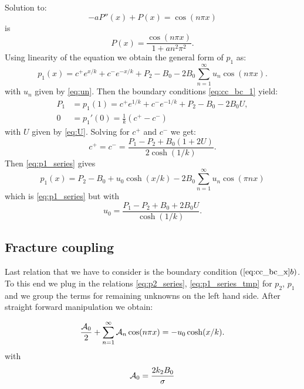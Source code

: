 \documentclass[a4paper,10pt]{article}
\begin{document}
Solution to:
\[
    - a P''(x) + P(x) = \cos(n \pi x) 
\]    
is 
\[
    P(x) = \frac{\cos(n \pi x)}{1+an^2\pi^2}.
\]
Using linearity of the equation we obtain the general form of $p_1$ as:
\begin {equation}
    \label{eq:p1_series}        
    p_1(x) = c^+ e^{x/k} + c^- e^{-x/k} + P_2 - B_0 
    - 2 B_0 \sum^{\infty}_{n=1} u_n \cos (n\pi x).
\end {equation}
with $u_n$ given by \eqref{eq:un}. Then the boundary conditions \eqref{eq:cc_bc_1} yield:
\begin{align*}
P_1 &= p_1(1) = c^+e^{1/k} + c^- e^{-1/k} + P_2 - B_0 - 2 B_0 U, \\
0 &= p_1'(0) = \frac{1}{k}(c^+ - c^-) 
\end{align*}
with $U$ given by \eqref{eq:U}. Solving for $c^+$ and $c^-$ we get:
\[
  c^+ = c^- = \frac{P_1 - P_2 + B_0(1 + 2 U)}{2\cosh(1/k)}.
\]
Then \eqref{eq:p1_series} gives 
\begin{equation}
    \label{eq:p1_series_tmp}
    p_1(x) = P_2 -  B_0 + u_0 \cosh(x/k) - 2B_0 \sum_{n=1}^\infty  u_n \cos(\pi n x) 
\end{equation}
which is \eqref{eq:p1_series} but with 
\begin{equation}
    \label{eq:u0_def}    
    u_0 = \frac{P_1 - P_2 + B_0 + 2 B_0 U}{\cosh(1/k)}.
\end{equation}



\subsection{Fracture coupling}
\label{sec:cont_coupling}

Last relation that we have to consider is the boundary condition $(\ref{eq:cc_bc_x}b)$. To this end we plug in the relations \eqref{eq:p2_series}, 
\eqref{eq:p1_series_tmp} for $p_2$, $p_1$  and we group the terms for remaining unknowns on the left hand side. After straight forward
manipulation we obtain:



\begin{equation}
    \label{eq:fourier_coupling}
    \frac{{\cal A}_0}{2} + \sum^{\infty}_{n=1} {\cal A}_n \cos (n\pi x) =  - u_0 \cosh(x/k).
\end{equation}
with
\begin{equation}
    \label{eq:fourier_A0}
    {\cal A}_0 = \frac{2 k_2 B_0}{\sigma} 
\end{equation}
\end{document}
